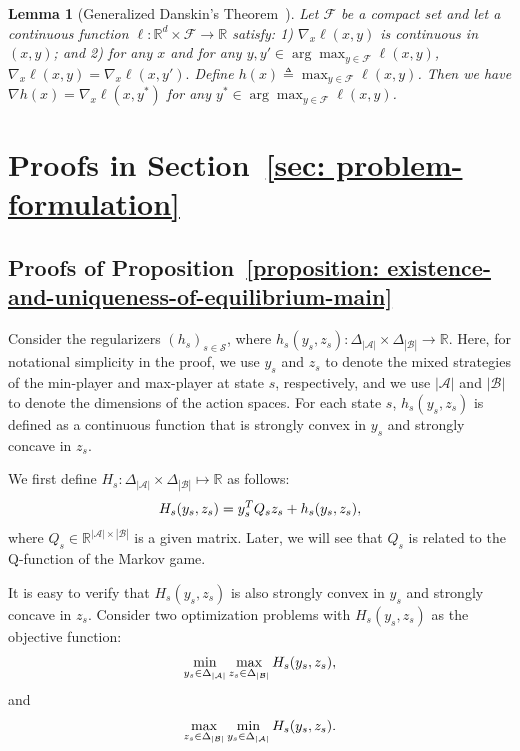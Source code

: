 \documentclass{article}
\theoremstyle{plain}
\newtheorem{lemma}{Lemma}
\theoremstyle{definition}
\theoremstyle{remark}
\def\cA{\mathcal A}
\def\cB{\mathcal B}
\def\cS{\mathcal S}
\def\bydef{\triangleq}
\begin{document}
\begin{lemma}[Generalized Danskin's Theorem~\citep{shen2025principled,clarke1975generalized}]
    \label{lemma: generalized-danskin-theorem}
    Let $\mathcal{F}$ be a compact set and let a continuous function 
$\ell : \mathbb{R}^d \times \mathcal{F} \to \mathbb{R}$ satisfy: 1) $\nabla_x \ell(x,y)$ is continuous in $(x,y)$;
and 2) for any $x$ and for any $y, y' \in \arg\max_{y \in \mathcal{F}} \ell(x,y)$,
    $   \nabla_x \ell(x,y) = \nabla_x \ell(x,y').$
Define
   $h(x) \bydef \max_{y \in \mathcal{F}} \ell(x,y)$.
Then we have
$\nabla h(x) = \nabla_x \ell(x,y^*)$ for any $y^* \in \arg\max_{y \in \mathcal{F}} \ell(x,y)$.
\end{lemma}
\section{Proofs in Section~\ref{sec: problem-formulation}}
\subsection{Proofs of Proposition~\ref{proposition: existence-and-uniqueness-of-equilibrium-main}}
Consider the regularizers $(h_s)_{s\in \cS}$, where $h_s(y_s,z_s): \Delta_{|\cA|} \times \Delta_{|\cB|} \to \mathbb{R}$. Here, for notational simplicity in the proof, we use $y_s$ and $z_s$ to denote the mixed strategies of the min-player and max-player at state $s$, respectively, and we use $|\cA|$ and $|\cB|$ to denote the dimensions of the action spaces. For each state $s$, $h_s(y_s,z_s)$ is defined as a continuous function that is strongly convex in $y_s$ and strongly concave in $z_s$.

We first define $H_s: \Delta_{|\cA|} \times \Delta_{|\cB|} \mapsto \mathbb{R}$ as follows:
\begin{align}
    H_s(y_s,z_s) = y_s^T Q_s z_s + h_s(y_s,z_s), \notag
\end{align}
where $Q_s \in \mathbb{R}^{|\cA| \times |\cB|}$ is a given matrix. Later, we will see that $Q_s$ is related to the Q-function of the Markov game.

It is easy to verify that $H_s(y_s,z_s)$ is also strongly convex in $y_s$ and strongly concave in $z_s$.
Consider two optimization problems with $H_s(y_s,z_s)$ as the objective function:
\begin{align}    
    \min_{y_s \in \Delta_{|\cA|}} \max_{z_s \in \Delta_{|\cB|}}  H_s(y_s,z_s) \notag, 
\end{align}
and
\begin{align}    
    \max_{z_s \in \Delta_{|\cB|}} \min_{y_s \in \Delta_{|\cA|}}  H_s(y_s,z_s) \notag.
\end{align}
\end{document}
